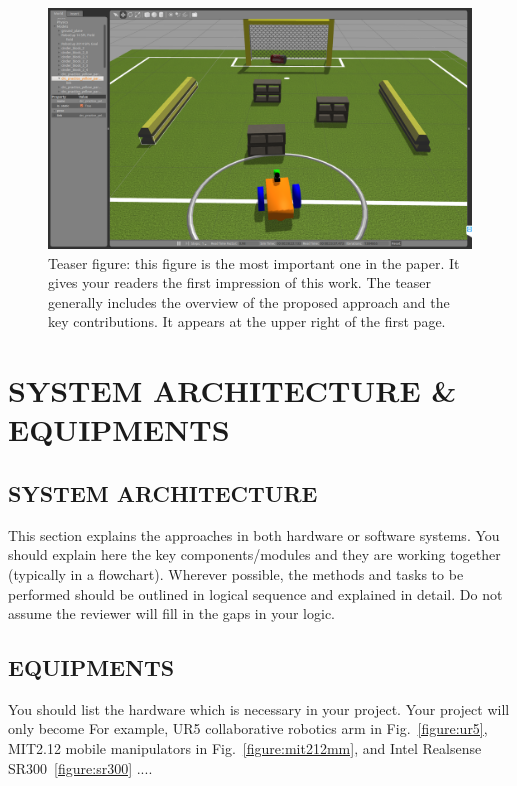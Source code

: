\documentclass[letterpaper, 10 pt, conference]{ieeeconf}  %
\begin{document}
\begin{figure}[t]
\includegraphics[width=0.95\columnwidth]{gazebo_view}
\centering
\caption{Teaser figure: this figure is the most important one in the paper. It gives your readers the first impression of this work. The teaser generally includes the overview of the proposed approach and the key contributions. It appears at the upper right of the first page.}
\end{figure}

\section{SYSTEM ARCHITECTURE \& EQUIPMENTS}

\subsection{SYSTEM ARCHITECTURE}

This section explains the approaches in both hardware or software systems. You should explain here the key components/modules and they are working together (typically in a flowchart). Wherever possible, the methods and tasks to be performed should be outlined in logical sequence and explained in detail. Do not assume the reviewer will fill in the gaps in your logic. 

\subsection{EQUIPMENTS} 

You should list the hardware which is necessary in your project. Your project will only become For example, UR5 collaborative robotics arm in Fig.~\ref{figure:ur5}, MIT2.12 mobile manipulators in Fig.~\ref{figure:mit212mm}, and Intel Realsense SR300~\ref{figure:sr300} ....
\end{document}
